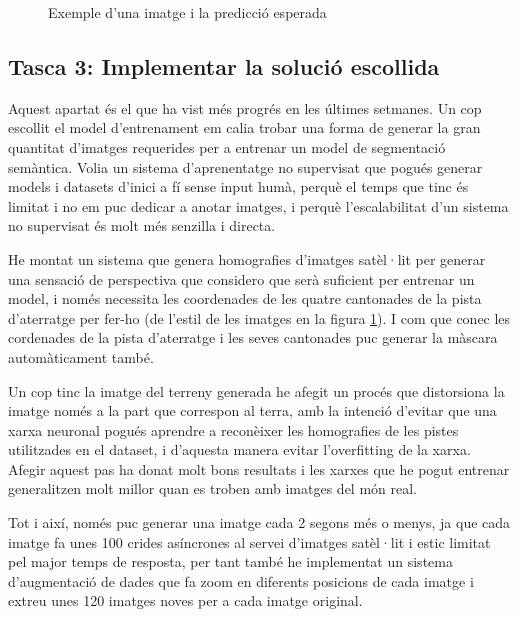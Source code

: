 \documentclass[10pt,a4paper,twocolumn,twoside]{article}
\begin{document}
\begin{figure}[h]
\centering
{}
    \caption{Exemple d'una imatge i la predicció esperada}
    \label{fig-img-seg-exmpl}
\end{figure}

\subsection{Tasca 3: Implementar la solució escollida}
Aquest apartat és el que ha vist més progrés en les últimes setmanes. Un cop escollit el model d'entrenament em calia trobar una forma de generar
la gran quantitat d'imatges requerides per a entrenar un model de segmentació semàntica. Volia un sistema d'aprenentatge no supervisat que pogués
generar models i datasets d'inici a fí sense input humà, perquè el temps que tinc és limitat i no em puc dedicar a anotar imatges, i perquè 
l'escalabilitat d'un sistema no supervisat és molt més senzilla i directa.

He montat un sistema que genera homografies d'imatges satèl·lit per generar una sensació de perspectiva que considero que serà suficient per entrenar
un model, i només necessita les coordenades de les quatre cantonades de la pista d'aterratge per fer-ho
(de l'estil de les imatges en la figura \ref{fig-img-seg-exmpl}).
I com que conec les cordenades de la pista d'aterratge i les seves cantonades puc generar la màscara automàticament també.

Un cop tinc la imatge del terreny generada he afegit un procés que distorsiona la imatge només a la part que correspon al terra, amb la intenció
d'evitar que una xarxa neuronal pogués aprendre a reconèixer les homografies de les pistes utilitzades en el dataset, i d'aquesta manera
evitar l'overfitting de la xarxa. Afegir aquest pas ha donat molt bons resultats i les xarxes que he pogut entrenar generalitzen molt millor
quan es troben amb imatges del món real.

Tot i així, només puc generar una imatge cada 2 segons més o menys, ja que cada imatge fa unes 100 crides asíncrones al servei d'imatges satèl·lit i estic
limitat pel major temps de resposta, per tant també he implementat un sistema d'augmentació de dades que fa zoom en diferents posicions de cada
imatge i extreu unes 120 imatges noves per a cada imatge original.
\end{document}
